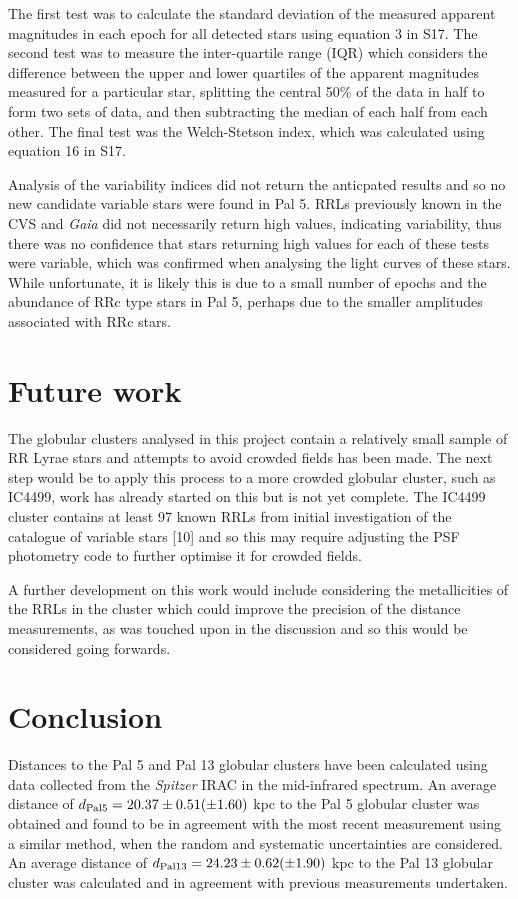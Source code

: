 \documentclass[11pt]{iopart}
\begin{document}
The first test was to calculate the standard deviation of the measured apparent magnitudes in each epoch for all detected stars using equation 3 in S17. The second test was to measure the inter-quartile range (IQR) which considers the difference between the upper and lower quartiles of the apparent magnitudes measured for a particular star, splitting the central 50\% of the data in half to form two sets of data, and then subtracting the median of each half from each other. The final test was the Welch-Stetson index, which was calculated using equation 16 in S17.

Analysis of the variability indices did not return the anticpated results and so no new candidate variable stars were found in Pal 5. RRLs previously known in the CVS and \textit{Gaia} did not necessarily return high values, indicating variability, thus there was no confidence that stars returning high values for each of these tests were variable, which was confirmed when analysing the light curves of these stars. While unfortunate, it is likely this is due to a small number of epochs and the abundance of RRc type stars in Pal 5, perhaps due to the smaller amplitudes associated with RRc stars.

\section{Future work}
The globular clusters analysed in this project contain a relatively small sample of RR Lyrae stars and attempts to avoid crowded fields has been made. The next step would be to apply this process to a more crowded globular cluster, such as IC4499, work has already started on this but is not yet complete. The IC4499 cluster contains at least 97 known RRLs from initial investigation of the catalogue of variable stars [10] and so this may require adjusting the PSF photometry code to further optimise it for crowded fields. 

A further development on this work would include considering the metallicities of the RRLs in the cluster which could improve the precision of the distance measurements, as was touched upon in the discussion and so this would be considered going forwards.

\section{Conclusion}
Distances to the Pal 5 and Pal 13 globular clusters have been calculated using data collected from the \textit{Spitzer} IRAC in the mid-infrared spectrum. An average distance of $d_{\rm Pal5} = 20.37 \pm 0.51 (\pm 1.60)$ kpc to the Pal 5 globular cluster was obtained and found to be in agreement with the most recent measurement using a similar method, when the random and systematic uncertainties are considered. An average distance of $d_{\rm Pal13} = 24.23 \pm 0.62 (\pm 1.90)$ kpc to the Pal 13 globular cluster was calculated and in agreement with previous measurements undertaken.
\end{document}
